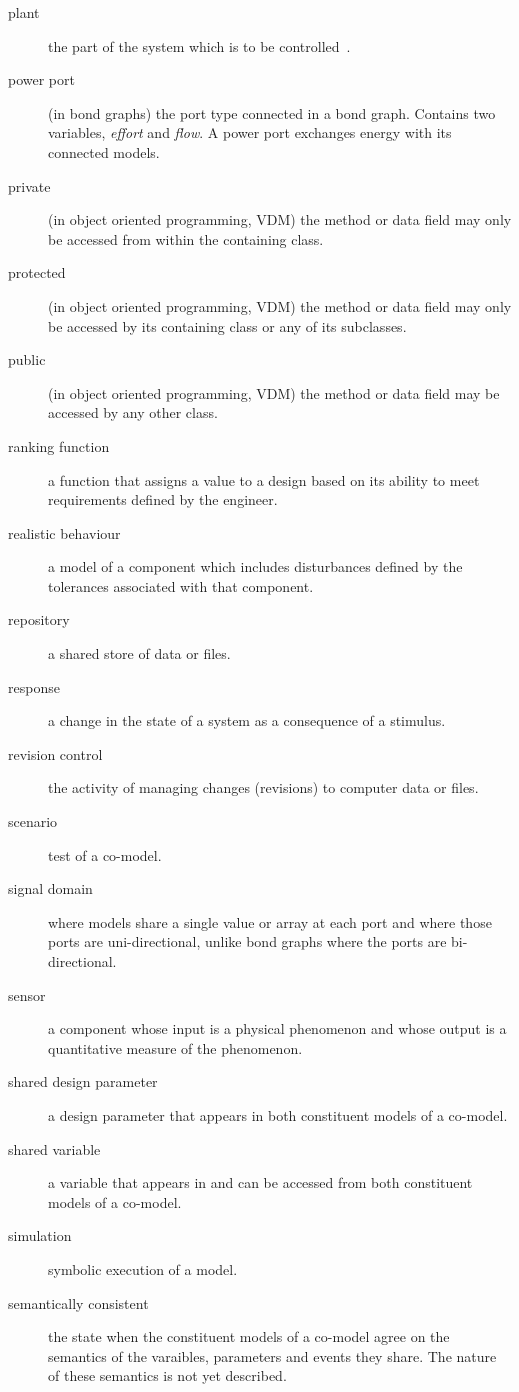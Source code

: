 \documentclass{crescendorepchap}
\begin{document}
\begin{description}
\item[plant] the part of the system which is to be controlled~\cite{IEEE100}.
\item[power port] (in bond graphs) the port type connected in a bond graph.  Contains two variables, \textit{effort} and \textit{flow}.  A power port exchanges energy with its connected models.
\item[private] (in object oriented programming, VDM) the method or data field may only be accessed from within the containing class.
\item[protected](in object oriented programming, VDM) the method or data field may only be accessed by its containing class or any of its subclasses.
\item[public] (in object oriented programming, VDM) the method or data field may be accessed by any other class.
\item[ranking function] a function that assigns a value to a design based on its ability to meet requirements defined by the engineer.
\item[realistic behaviour] a model of a component which includes disturbances defined by the tolerances associated with that component.
\item[repository] a shared store of data or files.
\item[response] a change in the state of a system as a consequence of a stimulus.
\item[revision control] the activity of managing changes (revisions) to computer data or files.
\item[scenario] test of a co-model.
\item[signal domain] where models share a single value or array at each port and where those ports are uni-directional, unlike bond graphs where the ports are bi-directional.
\item[sensor] a component whose input is a physical phenomenon and whose output is a quantitative measure of the phenomenon.
\item[shared design parameter] a design parameter that appears in both constituent models of a co-model.
\item[shared variable] a variable that appears in and can be accessed from both constituent models of a co-model.
\item[simulation] symbolic execution of a model.
\item[semantically consistent] the state when the constituent models of a co-model agree on the semantics of the varaibles, parameters and events they share.  The nature of these semantics is not yet described.

\end{description}
\end{document}
